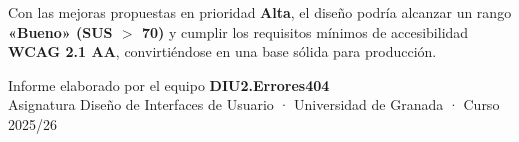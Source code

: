 \documentclass[11pt,a4paper]{article}
\begin{document}
\begin{keybox}
Con las mejoras propuestas en prioridad \textbf{Alta}, el diseño podría alcanzar un rango
\textbf{«Bueno» (SUS $>$ 70)} y cumplir los requisitos mínimos de accesibilidad
\textbf{WCAG 2.1 AA}, convirtiéndose en una base sólida para producción.
\end{keybox}

\vspace{2.5em}
\noindent{\color{goikored}\rule{\textwidth}{1pt}}
\vspace{0.4em}

\begin{center}
  \small\color{medgray}
  Informe elaborado por el equipo \textbf{DIU2.Errores404}\\
  Asignatura Diseño de Interfaces de Usuario ·
  Universidad de Granada · Curso 2025/26
\end{center}
\end{document}
